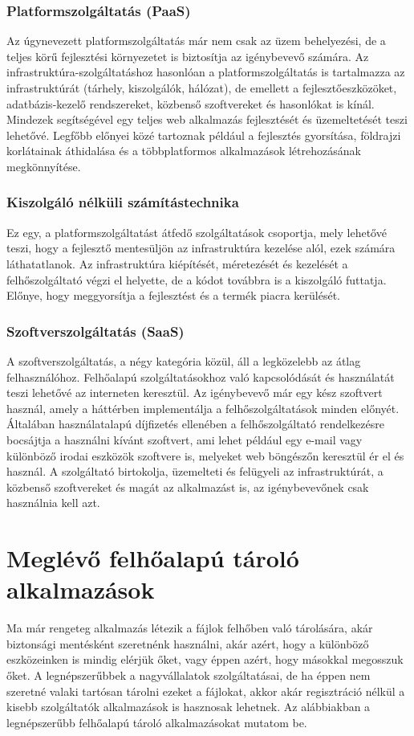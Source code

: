 \documentclass[12pt, twoside]{report}
\begin{document}
\subsection{Platformszolgáltatás (PaaS)}
Az úgynevezett platformszolgáltatás már nem csak az üzem behelyezési, de a teljes körű fejlesztési környezetet is biztosítja az igénybevevő számára. Az infrastruktúra-szolgáltatáshoz hasonlóan a platformszolgáltatás is tartalmazza az infrastruktúrát (tárhely, kiszolgálók, hálózat), de emellett a fejlesztőeszközöket, adatbázis-kezelő rendszereket, közbenső szoftvereket és hasonlókat is kínál. Mindezek segítségével egy teljes web alkalmazás fejlesztését és üzemeltetését teszi lehetővé. Legfőbb előnyei közé tartoznak például a fejlesztés gyorsítása, földrajzi korlátainak áthidalása és a többplatformos alkalmazások létrehozásának megkönnyítése.
\subsection{Kiszolgáló nélküli számítástechnika}
Ez egy, a platformszolgáltatást átfedő szolgáltatások csoportja, mely lehetővé teszi, hogy a fejlesztő mentesüljön az infrastruktúra kezelése alól, ezek számára láthatatlanok. Az infrastruktúra kiépítését, méretezését és kezelését a felhőszolgáltató végzi el helyette, de a kódot továbbra is a kiszolgáló futtatja. Előnye, hogy meggyorsítja a fejlesztést és a termék piacra kerülését.
\subsection{Szoftverszolgáltatás (SaaS)}
A szoftverszolgáltatás, a négy kategória közül, áll a legközelebb az átlag felhasználóhoz. Felhőalapú szolgáltatásokhoz való kapcsolódását és használatát teszi lehetővé az interneten keresztül. Az igénybevevő már egy kész szoftvert használ, amely a háttérben implementálja a felhőszolgáltatások minden előnyét. Általában használatalapú díjfizetés ellenében a felhőszolgáltató rendelkezésre bocsájtja a használni kívánt szoftvert, ami lehet például egy e-mail vagy különböző irodai eszközök szoftvere is, melyeket web böngészőn keresztül ér el és használ. A szolgáltató birtokolja, üzemelteti és felügyeli az infrastruktúrát, a közbenső szoftvereket és magát az alkalmazást is, az igénybevevőnek csak használnia kell azt.


\chapter{Meglévő felhőalapú tároló alkalmazások}
Ma már rengeteg alkalmazás létezik a fájlok felhőben való tárolására, akár biztonsági mentésként szeretnénk használni, akár azért, hogy a különböző eszközeinken is mindig elérjük őket, vagy éppen azért, hogy másokkal megosszuk őket. A legnépszerűbbek a nagyvállalatok szolgáltatásai, de ha éppen nem szeretné valaki tartósan tárolni ezeket a fájlokat, akkor akár regisztráció nélkül a kisebb szolgáltatók alkalmazások is hasznosak lehetnek. Az alábbiakban a legnépszerűbb felhőalapú tároló alkalmazásokat mutatom be.
\end{document}
